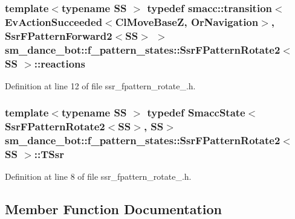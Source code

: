 \subsubsection[{\texorpdfstring{reactions}{reactions}}]{\setlength{\rightskip}{0pt plus 5cm}template$<$typename SS $>$ typedef {\bf smacc\+::transition}$<$Ev\+Action\+Succeeded$<${\bf Cl\+Move\+BaseZ}, {\bf Or\+Navigation}$>$, {\bf Ssr\+F\+Pattern\+Forward2}$<$SS$>$ $>$ {\bf sm\+\_\+dance\+\_\+bot\+::f\+\_\+pattern\+\_\+states\+::\+Ssr\+F\+Pattern\+Rotate2}$<$ SS $>$\+::{\bf reactions}}\hypertarget{structsm__dance__bot_1_1f__pattern__states_1_1SsrFPatternRotate2_a60e1e60258a4a8fcc411e8045af9a7f7}{}\label{structsm__dance__bot_1_1f__pattern__states_1_1SsrFPatternRotate2_a60e1e60258a4a8fcc411e8045af9a7f7}


Definition at line 12 of file ssr\+\_\+fpattern\+\_\+rotate\+\_.\+h.

\subsubsection[{\texorpdfstring{T\+Ssr}{TSsr}}]{\setlength{\rightskip}{0pt plus 5cm}template$<$typename SS $>$ typedef {\bf Smacc\+State}$<${\bf Ssr\+F\+Pattern\+Rotate2}$<$SS$>$, SS$>$ {\bf sm\+\_\+dance\+\_\+bot\+::f\+\_\+pattern\+\_\+states\+::\+Ssr\+F\+Pattern\+Rotate2}$<$ SS $>$\+::{\bf T\+Ssr}}\hypertarget{structsm__dance__bot_1_1f__pattern__states_1_1SsrFPatternRotate2_a88a56b5e255ad57b622ffc4f8c412fa0}{}\label{structsm__dance__bot_1_1f__pattern__states_1_1SsrFPatternRotate2_a88a56b5e255ad57b622ffc4f8c412fa0}


Definition at line 8 of file ssr\+\_\+fpattern\+\_\+rotate\+\_.\+h.



\subsection{Member Function Documentation}
